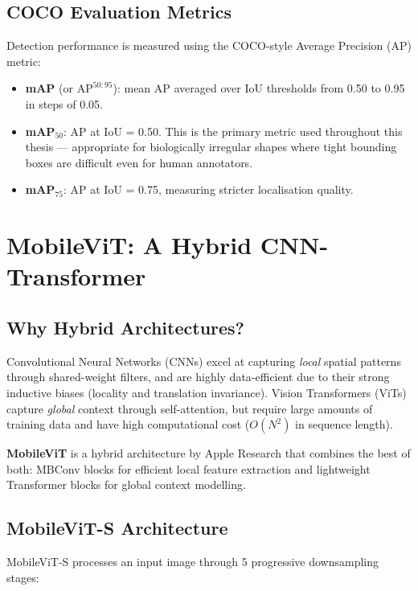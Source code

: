 \subsection{COCO Evaluation Metrics}

Detection performance is measured using the COCO-style Average Precision (AP) metric:

\begin{itemize}
    \item \textbf{mAP} (or $\text{AP}^{50:95}$): mean AP averaged over IoU thresholds from 0.50 to 0.95 in steps of 0.05.
    \item \textbf{mAP$_{50}$}: AP at IoU = 0.50. This is the primary metric used throughout this thesis — appropriate for biologically irregular shapes where tight bounding boxes are difficult even for human annotators.
    \item \textbf{mAP$_{75}$}: AP at IoU = 0.75, measuring stricter localisation quality.
\end{itemize}

\section{MobileViT: A Hybrid CNN-Transformer}

\subsection{Why Hybrid Architectures?}

Convolutional Neural Networks (CNNs) excel at capturing \textit{local} spatial patterns through shared-weight filters, and are highly data-efficient due to their strong inductive biases (locality and translation invariance). Vision Transformers (ViTs) \cite{ref2} capture \textit{global} context through self-attention, but require large amounts of training data and have high computational cost ($O(N^2)$ in sequence length).

\textbf{MobileViT} \cite{ref3} is a hybrid architecture by Apple Research that combines the best of both: MBConv blocks for efficient local feature extraction and lightweight Transformer blocks for global context modelling.

\subsection{MobileViT-S Architecture}

MobileViT-S processes an input image through 5 progressive downsampling stages:

